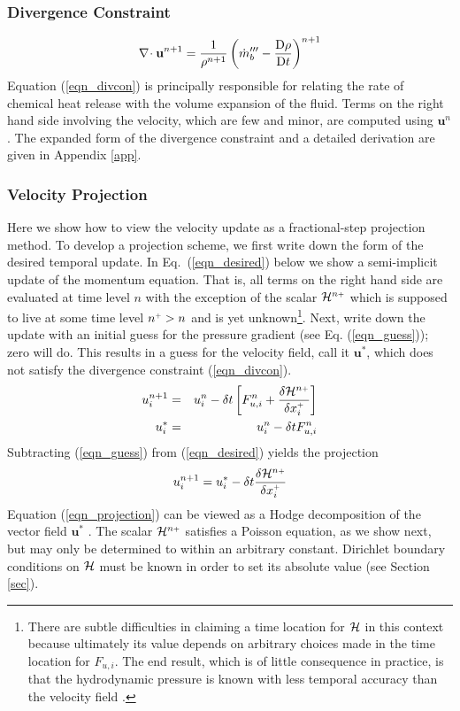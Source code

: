 \documentclass[11pt]{article}
\begin{document}
\subsubsection{Divergence Constraint}

\begin{equation}
\label{eqn_divcon}
{\nabla\!\cdot\mathbf{u}}^{n+1} = \frac{1}{\rho^{n+1}}\left(\dot{m}_b^{\prime\prime\prime} - \frac{\mbox{D}\rho}{\mbox{D}t}\right)^{n+1}
\end{equation}
Equation (\ref{eqn_divcon}) is principally responsible for relating the rate of chemical heat release with the volume expansion of the fluid.  Terms on the right hand side involving the velocity, which are few and minor, are computed using $\mathbf{u}^n$.  The expanded form of the divergence constraint and a detailed derivation are given in Appendix \ref{app}.

\subsubsection{Velocity Projection}

Here we show how to view the velocity update as a fractional-step projection method.  To develop a projection scheme, we first write down the form of the desired temporal update.  In Eq.~(\ref{eqn_desired}) below we show a semi-implicit update of the momentum equation.  That is, all terms on the right hand side are evaluated at time level $n$ with the exception of the scalar ${\cal H}^{n{\scriptscriptstyle +}}$ which is supposed to live at some time level $n^{\scriptscriptstyle +} >n$ and is yet unknown\footnote[1]{There are subtle difficulties in claiming a time location for $\cal H$ in this context because ultimately its value depends on arbitrary choices made in the time location for $F_{u,i}$. The end result, which is of little consequence in practice, is that the hydrodynamic pressure is known with less temporal accuracy than the velocity field \cite{Almgren}.}.  Next, write down the update with an initial guess for the pressure gradient (see Eq. (\ref{eqn_guess})); zero will do.  This results in a guess for the velocity field, call it $\mathbf{u}^*$, which does not satisfy the divergence constraint (\ref{eqn_divcon}).
\begin{eqnarray}
\label{eqn_desired} u_i^{n+1} &=& u_i^n - \delta t \left[ F_{u,i}^n + \frac{\delta {\cal H}^{n{\scriptscriptstyle +}}}{\delta x_i^{\scriptscriptstyle +}} \right] \\
\label{eqn_guess} u_i^* &=& u_i^n - \delta t F_{u,i}^n
\end{eqnarray}
Subtracting (\ref{eqn_guess}) from (\ref{eqn_desired}) yields the projection
\begin{equation}
\label{eqn_projection}
u_i^{n+1} = u_i^* - \delta t \frac{\delta {\cal H}^{n{\scriptscriptstyle +}}}{\delta x_i^{\scriptscriptstyle +}}
\end{equation}
Equation (\ref{eqn_projection}) can be viewed as a Hodge decomposition of the vector field $\mathbf{u}^*$ \cite{Chorin}.  The scalar ${\cal H}^{n{\scriptscriptstyle +}}$ satisfies a Poisson equation, as we show next, but may only be determined to within an arbitrary constant.  Dirichlet boundary conditions on ${\cal H}$ must be known in order to set its absolute value (see Section \ref{sec}).
\end{document}
